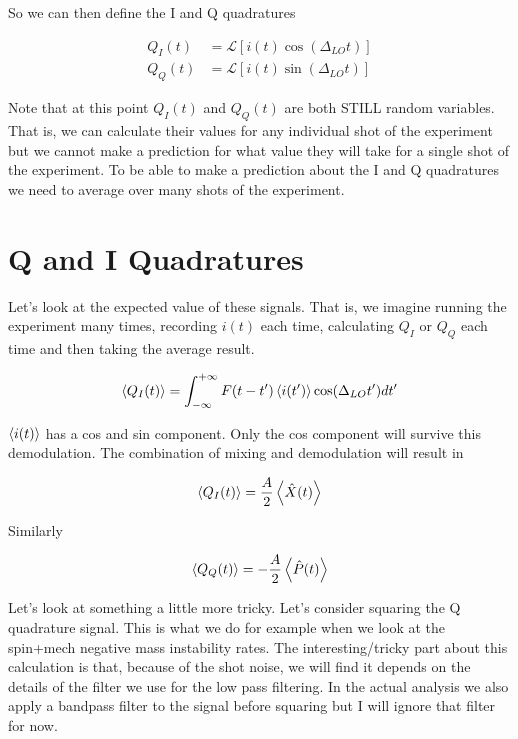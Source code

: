 \documentclass[12pt]{article}
\begin{document}
So we can then define the I and Q quadratures

\begin{align}
Q_I(t) &= \mathcal{L}[i(t)\cos(\Delta_{LO}t)]\\
Q_Q(t) &= \mathcal{L}[i(t)\sin(\Delta_{LO}t)]
\end{align}

Note that at this point $Q_I(t)$ and $Q_Q(t)$ are both STILL random variables. That is, we can calculate their values for any individual shot of the experiment but we cannot make a prediction for what value they will take for a single shot of the experiment. To be able to make a prediction about the I and Q quadratures we need to average over many shots of the experiment.

\section{Q and I Quadratures}

Let's look at the expected value of these signals. That is, we imagine running the experiment many times, recording $i(t)$ each time, calculating $Q_I$ or $Q_Q$ each time and then taking the average result.

\begin{align}
\braket{Q_I(t)} = \int_{-\infty}^{+\infty} F(t-t')\braket{i(t')} \cos(\Delta_{LO}t') dt'
\end{align}

$\braket{i(t)}$ has a cos and sin component. Only the cos component will survive this demodulation. The combination of mixing and demodulation will result in

\begin{align}
\braket{Q_I(t)} = \frac{A}{2} \left<\hat{X}(t)\right>
\end{align}

Similarly

\begin{align}
\braket{Q_Q(t)} = -\frac{A}{2} \left<\hat{P}(t)\right>
\end{align}

Let's look at something a little more tricky. Let's consider squaring the Q quadrature signal. This is what we do for example when we look at the spin+mech negative mass instability rates. The interesting/tricky part about this calculation is that, because of the shot noise, we will find it depends on the details of the filter we use for the low pass filtering. In the actual analysis we also apply a bandpass filter to the signal before squaring but I will ignore that filter for now.
\end{document}

